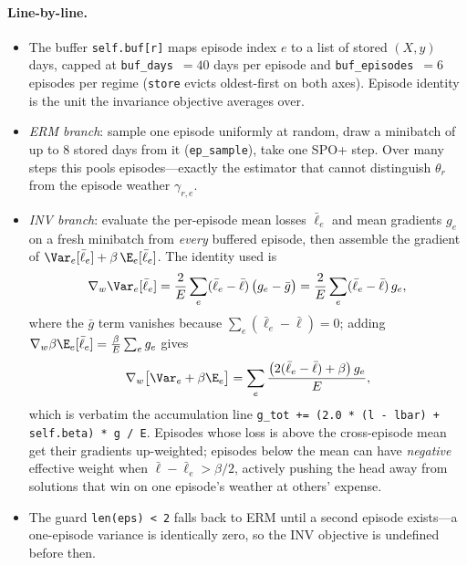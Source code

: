\paragraph{Line-by-line.}
\begin{itemize}
  \item The buffer \texttt{self.buf[r]} maps episode index $e$ to a list of
        stored $(X, y)$ days, capped at \texttt{buf\_days}~$=40$ days per
        episode and \texttt{buf\_episodes}~$=6$ episodes per regime
        (\texttt{store} evicts oldest-first on both axes). Episode identity
        is the unit the invariance objective averages over.
  \item \emph{ERM branch}: sample one episode uniformly at random, draw a
        minibatch of up to 8 stored days from it (\texttt{ep\_sample}), take
        one SPO+ step. Over many steps this pools episodes---exactly the
        estimator that cannot distinguish $\theta_r$ from the episode
        weather $\gamma_{r,e}$.
  \item \emph{INV branch}: evaluate the per-episode mean losses $\bar\ell_e$
        and mean gradients $g_e$ on a fresh minibatch from \emph{every}
        buffered episode, then assemble the gradient of
        $\Var_e[\bar\ell_e] + \beta\, \E_e[\bar\ell_e]$. The identity used
        is
        \[
          \nabla_w \Var_e[\bar\ell_e]
          = \frac{2}{E} \sum_e (\bar\ell_e - \bar\ell)\,
            \big(g_e - \bar g\big)
          = \frac{2}{E} \sum_e (\bar\ell_e - \bar\ell)\, g_e,
        \]
        where the $\bar g$ term vanishes because
        $\sum_e (\bar\ell_e - \bar\ell) = 0$; adding
        $\nabla_w \beta \E_e[\bar\ell_e] = \frac{\beta}{E}\sum_e g_e$ gives
        \[
          \nabla_w \big[\Var_e + \beta \E_e\big]
          = \sum_e \frac{\big(2(\bar\ell_e - \bar\ell) + \beta\big)\, g_e}{E},
        \]
        which is verbatim the accumulation line
        \texttt{g\_tot += (2.0 * (l - lbar) + self.beta) * g / E}. Episodes
        whose loss is above the cross-episode mean get their gradients
        up-weighted; episodes below the mean can have \emph{negative}
        effective weight when $\bar\ell - \bar\ell_e > \beta/2$, actively
        pushing the head away from solutions that win on one episode's
        weather at others' expense.
  \item The guard \texttt{len(eps) < 2} falls back to ERM until a second
        episode exists---a one-episode variance is identically zero, so the
        INV objective is undefined before then.
\end{itemize}

